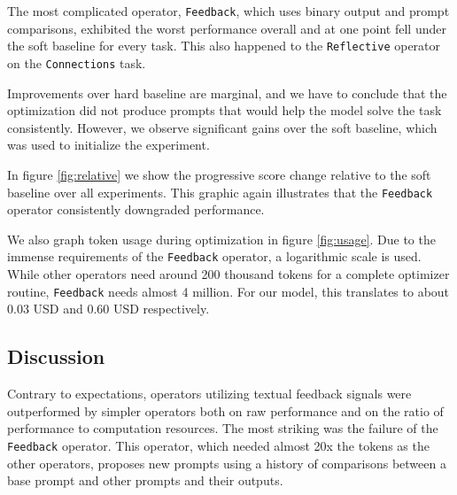 The most complicated operator, \texttt{Feedback}, which uses binary output and prompt comparisons, exhibited the
worst performance overall and at one point fell under the soft baseline for every task. This also happened to the
\texttt{Reflective} operator on the \texttt{Connections} task.

Improvements over hard baseline are marginal, and we have to conclude that the optimization did not produce 
prompts that would help the model solve the task consistently. However, we observe significant gains 
over the soft baseline, which was used to initialize the experiment.

In figure \ref{fig:relative} we show the progressive score change relative to the soft baseline
over all experiments. This graphic again illustrates that the \texttt{Feedback} operator consistently downgraded performance.

We also graph token usage during optimization in figure \ref{fig:usage}. Due to the immense requirements of
the \texttt{Feedback} operator, a logarithmic scale is used. While other operators need around 200 thousand tokens for a complete optimizer routine,
\texttt{Feedback} needs almost 4 million. For our model, this translates to about 0.03 USD and 0.60 USD respectively.


\subsection{Discussion}

Contrary to expectations, operators utilizing textual feedback signals were outperformed by simpler operators
both on raw performance and on the ratio of performance to computation resources.
The most striking was the failure of the \texttt{Feedback} operator. This operator, which needed almost 20x the tokens as the other operators,
proposes new prompts using a history of comparisons between a base prompt and other prompts and their outputs. 

